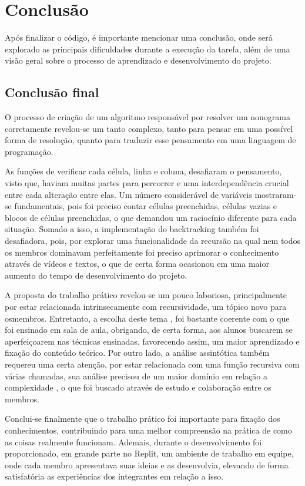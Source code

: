 \documentclass{article}
\begin{document}
\section{Conclusão}
Após finalizar o código, é importante mencionar uma conclusão, onde será explorado as principais dificuldades durante a execução da tarefa, além de uma visão geral sobre o processo de aprendizado e desenvolvimento do projeto.

\subsection{Conclusão final}

\indent O processo de criação de um algoritmo responsável por resolver um nonograma corretamente revelou-se um tanto complexo, tanto para pensar em uma possível forma de resolução, quanto para traduzir esse pensamento em uma linguagem de programação.

As funções de verificar cada célula, linha e coluna, desafiaram o pensamento, visto que, haviam muitas partes para percorrer e uma interdependência crucial entre cada alteração entre elas. Um número considerável de variáveis mostraram-se fundamentais, pois foi preciso contar células preenchidas,  células vazias e blocos de células preenchidas, o que demandou um raciocínio diferente para cada situação. Somado a isso, a implementação do backtracking também foi desafiadora, pois, por explorar uma funcionalidade da recursão na qual nem todos os membros dominavam perfeitamente foi preciso aprimorar o conhecimento através de vídeos e textos, o que de certa forma ocasionou em uma maior aumento do tempo de desenvolvimento do projeto.
	
A proposta do trabalho prático revelou-se um pouco laboriosa, principalmente por estar relacionada intrinsecamente com recursividade, um tópico novo para osmembros. Entretanto, a escolha deste tema , foi bastante coerente com o que foi ensinado em sala de aula, obrigando, de certa forma, aos alunos buscarem se aperfeiçoarem nas técnicas ensinadas, favorecendo assim, um maior aprendizado e fixação do conteúdo teórico. Por outro lado, a análise assintótica também requereu uma certa atenção, por estar relacionada com uma função recursiva com várias chamadas, sua análise precisou de um maior domínio em relação a complexidade , o que foi buscado através de estudo e colaboração entre os membros.
	
Conclui-se finalmente que o trabalho prático foi importante para fixação dos conhecimentos, contribuindo para uma melhor compreensão na prática de como as coisas realmente funcionam. Ademais, durante o desenvolvimento foi proporcionado, em grande parte no Replit, um ambiente de trabalho em equipe, onde cada membro apresentava suas ideias e as desenvolvia, elevando de forma satisfatória as experiências dos integrantes em relação a isso.
\end{document}
